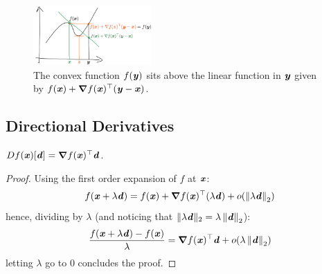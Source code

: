  \begin{figure}[h]
  \centering
  \includegraphics[width=0.4\textwidth]{fig/lecture2_taylor-1st-order-remainder.png}
\caption{The convex function $f(\yy)$ sits above the linear function
  in $\yy$ given by
  ${f(\xx) + \grad f(\xx)^\trp  (\yy-\xx)}$.}
\label{fig:nonjointconvex}
\end{figure}
%

\subsection{Directional Derivatives}



\begin{proposition}\label{prp:directional}
$\D{f(\xx)}{\dd} = \grad f (\xx)^\trp  \dd$.
\end{proposition}

\begin{proof}
    Using the first order expansion of $f$ at $\xx$:
    \begin{displaymath}
        f(\xx+\lambda \dd) = f(\xx) + \grad f(\xx)^\trp (\lambda \dd) +o(\norm{\lambda \dd}_2)
    \end{displaymath}
    hence, dividing by $\lambda$ (and noticing that $\|\lambda \dd\|_2 = \lambda \norm{ \dd}_2$):
    \begin{displaymath}
        \frac{f(\xx+\lambda \dd)-f(\xx)}{\lambda} = \grad f(\xx)^\trp  \dd + o(\lambda  \norm{ \dd}_2)
    \end{displaymath}
    letting $\lambda$ go to $0$ concludes the proof.
\end{proof}



